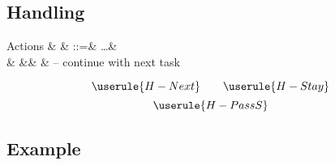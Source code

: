 \subsection{Handling}

\begin{grammar}
  Actions
    & \alpha & ::=& \ldots & \\
    &        &\mid& \Next  & – continue with next task \\
\end{grammar}

\begin{equation*}
  \userule{H-Next} \qquad \userule{H-Stay}
\end{equation*}
\begin{equation*}
  \userule{H-PassS}
\end{equation*}

\subsection{Example}
